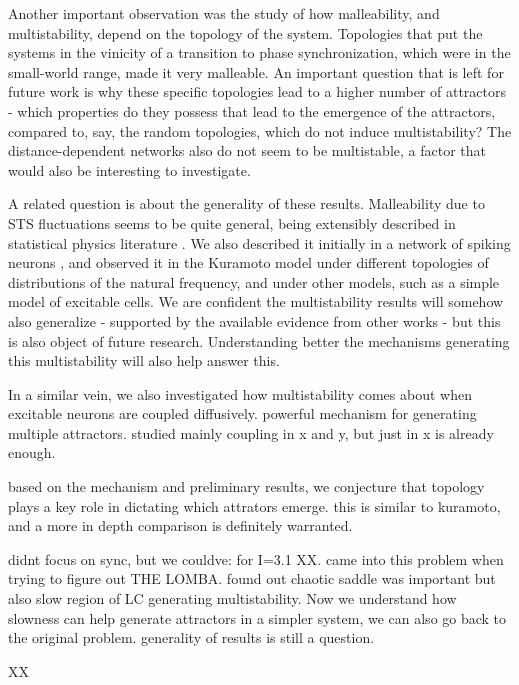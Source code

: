 Another important observation was the study of how malleability, and multistability, depend on the topology of the system. Topologies that put the systems in the vinicity of a transition to phase synchronization, which were in the small-world range, made it very malleable. An important question that is left for future work is why these specific topologies lead to a higher number of attractors - which properties do they possess that lead to the emergence of the attractors, compared to, say, the random topologies, which do not induce multistability? The distance-dependent networks also do not seem to be multistable, a factor that would also be interesting to investigate. 

A related question is about the generality of these results. Malleability due to STS fluctuations seems to be quite general, being extensibly described in statistical physics literature \cite{sornette2006critical}. We also described it initially in a network of spiking neurons \cite{budzinski2020synchronization}, and observed it in the Kuramoto model under different topologies of distributions of the natural frequency, and under other models, such as a simple model of excitable cells. We are confident the multistability results will somehow also generalize - supported by the available evidence from other works - but this is also object of future research. Understanding better the mechanisms generating this multistability will also help answer this.

In a similar vein, we also investigated how multistability comes about when excitable neurons are coupled diffusively. 
powerful mechanism for generating multiple attractors.
studied mainly coupling in x and y, but just in x is already enough. 

based on the mechanism and preliminary results, we conjecture that topology plays a key role in dictating which attrators emerge. this is similar to kuramoto, and a more in depth comparison is definitely warranted.

didnt focus on sync, but we couldve: for I=3.1 XX.
came into this problem when trying to figure out THE LOMBA. found out chaotic saddle was important but also slow region of LC generating multistability. Now we understand how slowness can help generate attractors in a simpler system, we can also go back to the original problem. 
generality of results is still a question.

XX


